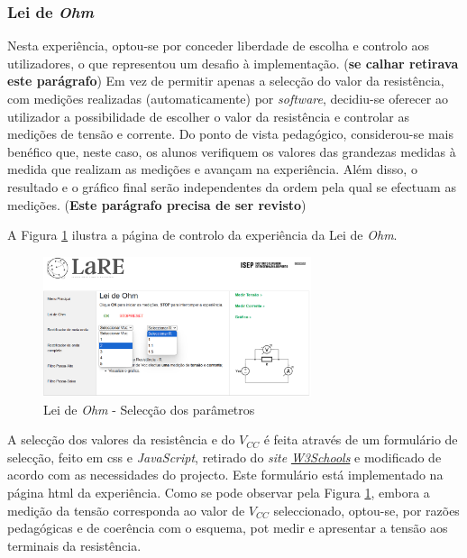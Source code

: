 \subsubsection{Lei de \textit{Ohm}}
Nesta experiência, optou-se por conceder liberdade de escolha e controlo aos utilizadores, o que representou um desafio à implementação. (\textbf{se calhar retirava este parágrafo}) Em vez de permitir apenas a selecção do valor da resistência, com medições realizadas (automaticamente) por \textit{software}, decidiu-se oferecer ao utilizador a possibilidade de escolher o valor da resistência e controlar as medições de tensão e corrente. Do ponto de vista pedagógico, considerou-se mais benéfico que, neste caso, os alunos verifiquem os valores das grandezas medidas à medida que realizam as medições e avançam na experiência. Além disso, o resultado e o gráfico final serão independentes da ordem pela qual se efectuam as medições. (\textbf{Este parágrafo precisa de ser revisto})

A Figura \ref{fig:pagmenuCTRL} ilustra a página de controlo da experiência da Lei de \textit{Ohm}. 

\begin{figure}[hbtp]
	\centering
	\includegraphics[width=0.7\textwidth]{figures/ohm_page_controlo-FULL.png}
	\caption{Lei de \textit{Ohm} - Selecção dos parâmetros}
	\label{fig:pagmenuCTRL}
\end{figure}

A selecção dos valores da resistência e do $V_{CC}$ é feita através de um formulário de selecção, feito em \acrshort{css} e \textit{JavaScript}, retirado do \textit{site} \href{https://www.w3schools.com/howto/howto_custom_select.asp}{\textit{W3Schools}} e modificado de acordo com as necessidades do projecto. Este formulário está implementado na página \acrshort{html} da experiência. Como se pode observar pela Figura \ref{fig:pagmenuCTRL}, embora a medição da tensão corresponda ao valor de $V_{CC}$ seleccionado, optou-se, por razões pedagógicas e de coerência com o esquema, pot medir e apresentar a tensão aos terminais da resistência.

